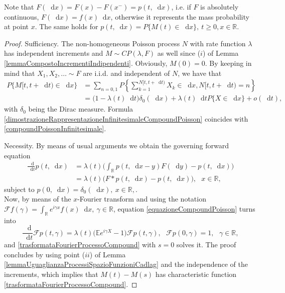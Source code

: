 \documentclass[12pt, twoside, english, headsepline]{article}
\newcommand*\dif{\mathop{}\!\mathrm{d}}  %
\theoremstyle{definition} %
\numberwithin{equation}{section} %
\begin{document}
Note that $F(\dif x) = F(x)-F(x^-) = p(t, \dif x)$, i.e. if $F$ is absolutely continuous, $F(\dif x) = f(x)\dif x$, otherwise it represents the mass probability at point $x$. The same holds for $p(t,\dif x) =P\{M(t) \in \dif x\},\ t\ge0,x\in\mathbb{R}$.

\begin{proof}
	Sufficiency. The non-homogeneous Poisson process $N$ with rate function $\lambda$ has independent increments and $M\sim CP(\lambda, F)$ as well since ($i$) of Lemma \ref{lemmaCompostoIncrementiIndipendenti}. Obviously, $M(0) = 0$. By keeping in mind that $X_1,X_2,\dots \sim F$ are i.i.d. and independent of $N$, we have that
\begin{align}
	P\{M[t,t+\dif t)\in \dif x\} %
	& = \sum_{n=0,1} P\left\{ \sum_{k=1}^{N[t,t+\dif t)} X_k\in \dif x, N[t,t+\dif t) = n\right\} \nonumber \\
	& = \big(1-\lambda(t)\dif t\big) \delta_0(\dif x) + \lambda(t)\dif t P\{X\in \dif x\} + o(\dif t), \label{dimostrazioneRappresentazioneInfinitesimaleCompoundPoisson}
\end{align}	
with $\delta_0$ being the Dirac measure. Formula \eqref{dimostrazioneRappresentazioneInfinitesimaleCompoundPoisson} coincides with \eqref{compoundPoissonInfinitesimale}.
	
	Necessity. By means of usual arguments we obtain 
	the governing forward equation
	\begin{align}
		\frac{\dif}{\dif t}p(t, \dif x) &= \lambda(t) \Bigg( \int_{\mathbb{R}} p(t, \dif x-y)F(\dif y) - p(t,\dif x)\Bigg) \nonumber\\
		& = \lambda(t) \big( F \ast p (t, \dif x) - p(t, \dif x) \big),\ \ \ x\in\mathbb{R}, \label{equazioneCompoundPoisson}
	\end{align}
	subject to $p(0, \dif x) = \delta_0(\dif x),\ x\in\mathbb{R},$.
	\\Now, by means of the $x$-Fourier transform and using the notation $\mathcal{F} f(\gamma) = \int_\mathbb{R} e^{i\gamma x}f(x)\dif x,\ \gamma\in\mathbb{R}$, equation \eqref{equazioneCompoundPoisson} turns into
	\begin{equation}
		\frac{\dif}{\dif t}\mathcal{F}p(t, \gamma) = \lambda(t)\Big(\mathbb{E}e^{i\gamma X} -1\Big)\mathcal{F}p(t,\gamma),\ \ \ \mathcal{F}p(0,\gamma) = 1,\ \ \ \gamma \in\mathbb{R},
	\end{equation}
	and \eqref{trasformataFourierProcessoCompound} with $s=0$ solves it. The proof concludes by using point ($ii$) of Lemma \ref{lemmaUguaglianzaProcessiSpazioFunzioniCadlag} and the independence of the increments, which implies that $M(t)-M(s)$ has characteristic function \eqref{trasformataFourierProcessoCompound}.
\end{proof}
\end{document}
